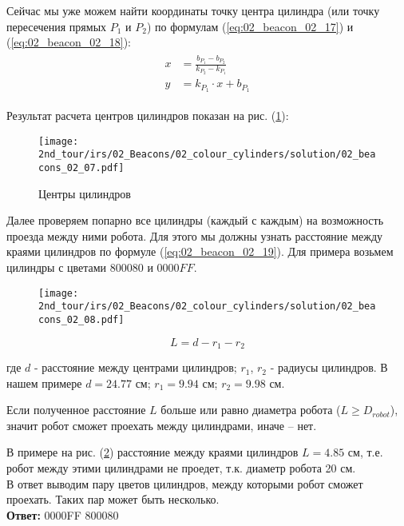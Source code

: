 Сейчас мы уже можем найти координаты точку центра цилиндра (или точку пересечения прямых $P_1$ и $P_2$) по формулам (\ref{eq:02_beacon_02_17}) и (\ref{eq:02_beacon_02_18}):
\begin{eqnarray}
\begin{aligned}
x &= \frac{b_{P_1} - b_{P_2}}{k_{P_2} - k_{P_1}}
\label{eq:02_beacon_02_17}\\
y &= k_{P_1} \cdot x + b_{P_1}
\label{eq:02_beacon_02_18}
\end{aligned}
\end{eqnarray}

Результат расчета центров цилиндров показан на рис. (\ref{fig:02_beacons_02_07}):
\begin{figure}[H]
	\centering
	\texttt{[image: 2nd\_tour/irs/02\_Beacons/02\_colour\_cylinders/solution/02\_beacons\_02\_07.pdf]}
	\caption{Центры цилиндров}
	\label{fig:02_beacons_02_07}
\end{figure}

Далее проверяем попарно все цилиндры (каждый с каждым) на возможность проезда между ними робота. Для этого мы должны узнать расстояние между краями цилиндров по формуле (\ref{eq:02_beacon_02_19}). Для примера возьмем цилиндры с цветами $800080$ и $0000FF$.

\begin{figure}[H]
	\centering
	\texttt{[image: 2nd\_tour/irs/02\_Beacons/02\_colour\_cylinders/solution/02\_beacons\_02\_08.pdf]}
	\caption{}
	\label{fig:02_beacons_02_08}
\end{figure}

\begin{equation}
L = d - r_1 - r_2
\label{eq:02_beacon_02_19}
\end{equation}

где $d$ - расстояние между центрами цилиндров; $r_1$, $r_2$ - радиусы цилиндров. 
В нашем примере $d = 24.77 \text{ см}$; $r_1=9.94 \text{ см}$; $r_2=9.98 \text{ см}$.

Если полученное расстояние $L$ больше или равно диаметра робота ($L \geq D_{robot}$), значит робот сможет проехать между цилиндрами, иначе – нет.

В примере на рис. (\ref{fig:02_beacons_02_08}) расстояние между краями цилиндров $L=4.85$ см, т.е. робот между этими цилиндрами не проедет, т.к. диаметр робота 20 см.
\\

В ответ выводим пару цветов цилиндров, между которыми робот сможет проехать. Таких пар может быть несколько.
\\

\textbf{Ответ: } 0000FF 800080


\codeExample

